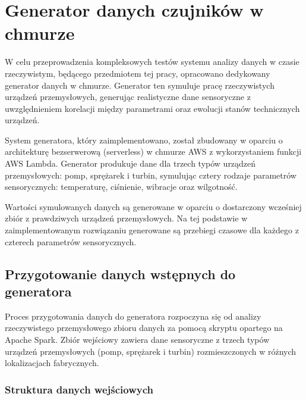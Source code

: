 \section{Generator danych czujników w chmurze}
\label{sec:implementacja_generowania}

W celu przeprowadzenia kompleksowych testów systemu analizy danych w czasie rzeczywistym, będącego przedmiotem tej pracy, opracowano dedykowany generator danych w chmurze. Generator ten symuluje pracę rzeczywistych urządzeń przemysłowych, generując realistyczne dane sensoryczne z uwzględnieniem korelacji między parametrami oraz ewolucji stanów technicznych urządzeń.

System generatora, który zaimplementowano, został zbudowany w oparciu o architekturę bezserwerową (serverless) w chmurze AWS z wykorzystaniem  funkcji AWS Lambda. Generator produkuje dane dla trzech typów urządzeń przemysłowych: pomp, sprężarek i turbin, symulując cztery rodzaje parametrów sensorycznych: temperaturę, ciśnienie, wibracje oraz wilgotność.

Wartości symulowanych danych są generowane w oparciu o dostarczony wcześniej zbiór z prawdziwych urządzeń przemysłowych. Na tej podstawie w zaimplementowanym rozwiązaniu generowane są przebiegi czasowe dla każdego z czterech parametrów sensorycznych.


\subsection{Przygotowanie danych wstępnych do generatora}

Proces przygotowania danych do generatora rozpoczyna się od analizy rzeczywistego przemysłowego zbioru danych za pomocą skryptu opartego na Apache Spark. Zbiór wejściowy zawiera dane sensoryczne z trzech typów urządzeń przemysłowych (pomp, sprężarek i turbin) rozmieszczonych w różnych lokalizacjach fabrycznych.

\subsubsection{Struktura danych wejściowych}

